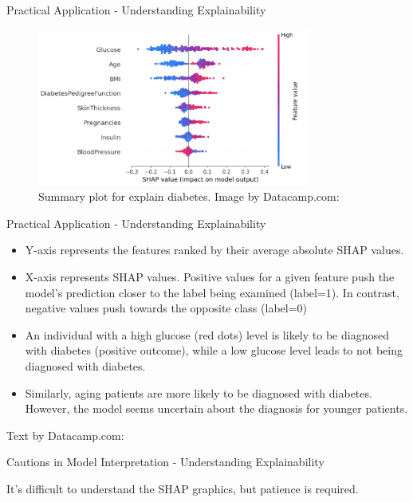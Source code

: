 \documentclass[aspectratio=169]{beamer}
\begin{document}
\begin{frame}{Practical Application - Understanding Explainability}

    \begin{figure}[htbp]
        \centering
        \includegraphics[width=0.8\textwidth]{figs/shap/Summary_Plot_deep_dive_on_label_diabete.png}
        \caption{Summary plot for explain diabetes. Image by Datacamp.com: \cite{datacamp_tutorial}}
        \label{fig:explain-diabetes}
    \end{figure}
\end{frame}

\begin{frame}{Practical Application - Understanding Explainability}

    \begin{itemize}
        \item Y-axis represents the features ranked by their average absolute \ac{SHAP} values.
        \item X-axis represents \ac{SHAP} values. Positive values for a given feature push the model’s prediction closer to the label being examined (label=1). In contrast, negative values push towards the opposite class (label=0)
        \item An individual with a high glucose (red dots) level is likely to be diagnosed with diabetes (positive outcome), while a low glucose level leads to not being diagnosed with diabetes.
        \item Similarly, aging patients are more likely to be diagnosed with diabetes. However, the model seems uncertain about the diagnosis for younger patients.
    \end{itemize}

    Text by Datacamp.com: \cite{datacamp_tutorial}
\end{frame}

\begin{frame}{Cautions in Model Interpretation - Understanding Explainability}

It's difficult to understand the \ac{SHAP} graphics, but patience is required.
    
\end{frame}
\end{document}
